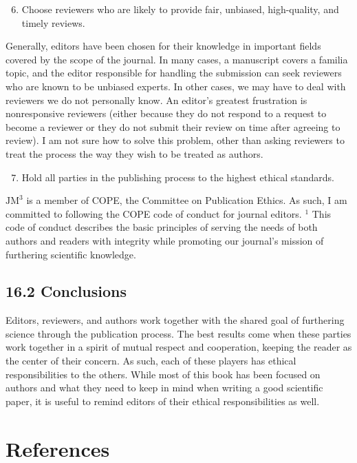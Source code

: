 \begin{enumerate}
  \setcounter{enumi}{5}
  \item Choose reviewers who are likely to provide fair, unbiased, high-quality, and timely reviews.
\end{enumerate}

Generally, editors have been chosen for their knowledge in important fields covered by the scope of the journal. In many cases, a manuscript covers a familia topic, and the editor responsible for handling the submission can seek reviewers who are known to be unbiased experts. In other cases, we may have to deal with reviewers we do not personally know. An editor's greatest frustration is nonresponsive reviewers (either because they do not respond to a request to become a reviewer or they do not submit their review on time after agreeing to review). I am not sure how to solve this problem, other than asking reviewers to treat the process the way they wish to be treated as authors.

\begin{enumerate}
  \setcounter{enumi}{6}
  \item Hold all parties in the publishing process to the highest ethical standards.
\end{enumerate}

$\mathrm{JM}^{3}$ is a member of COPE, the Committee on Publication Ethics. As such, I am committed to following the COPE code of conduct for journal editors. ${ }^{1}$ This code of conduct describes the basic principles of serving the needs of both authors and readers with integrity while promoting our journal's mission of furthering scientific knowledge.

\subsection*{16.2 Conclusions}
Editors, reviewers, and authors work together with the shared goal of furthering science through the publication process. The best results come when these parties work together in a spirit of mutual respect and cooperation, keeping the reader as the center of their concern. As such, each of these players has ethical responsibilities to the others. While most of this book has been focused on authors and what they need to keep in mind when writing a good scientific paper, it is useful to remind editors of their ethical responsibilities as well.

\section*{References}

